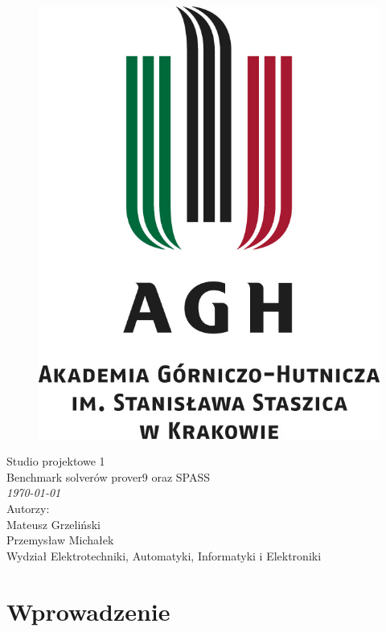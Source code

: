 \documentclass[a4paper,12pt]{article}
\begin{document}
\onehalfspacing
\begin{figure}[!htb]
  \centerline{\includegraphics[scale=0.8]{../images/agh_logo.jpg}}
\end{figure}

\begin{center}
  \Huge{Studio projektowe 1\\}
  \Large{Benchmark solverów prover9 oraz SPASS\\ \large \textit \today \\}
  \vspace{3cm}
  \Large{	Autorzy:\\
    Mateusz Grzeliński\\
    Przemysław Michałek\\
  }
  \large{Wydział Elektrotechniki, Automatyki, Informatyki i Elektroniki}

  \newpage
\end{center}

\tableofcontents
\newpage

\section{Wprowadzenie}
\end{document}
